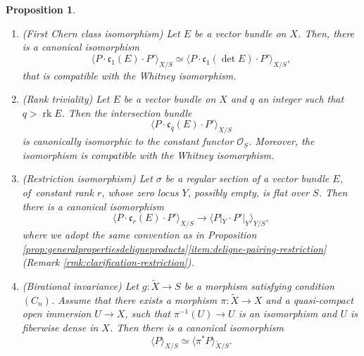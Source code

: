 \documentclass[JEP,XML,SOM,Unicode,published]{cedram}
\theoremstyle{plain}
\newtheorem{proposition}[theorem]{Proposition}
\theoremstyle{definition}
\newcommand{\Ocal}{\mathcal O}
\newcommand{\cfrak}{\mathfrak c}
\DeclareMathOperator{\rk}{rk}
\begin{document}
\begin{proposition}
\begin{enumerate}
\item\label{item:first-chern-determinant} (First Chern class isomorphism) Let $E$ be a vector bundle on $X$. Then, there is a canonical isomorphism
\begin{displaymath}
\langle P\cdot \cfrak_{1}(E)\cdot P'\rangle_{X/S} \simeq \langle P\cdot \cfrak_{1}(\det E)\cdot P'\rangle_{X/S},
\end{displaymath}
that is compatible with the Whitney isomorphism.
\item \label{item:Chern-rank}(Rank triviality) Let $E$ be a vector bundle on $X$ and $q$ an integer such that $q > \rk E$. Then the intersection bundle
\begin{displaymath}
\langle P \cdot \cfrak_q(E) \cdot P' \rangle_{X/S}
\end{displaymath}
is canonically isomorphic to the constant functor $\Ocal_S$. Moreover, the isomorphism is compatible with the Whitney isomorphism.
\item\label{item:restriction-isomorphism} (Restriction isomorphism) Let $\sigma$ be a regular section of a vector bundle $E$, of~constant rank $r$, whose zero locus $Y$, possibly empty, is flat over $S$. Then there is a canonical isomorphism
\begin{displaymath}
\langle P \cdot \cfrak_{r}(E) \cdot P' \rangle_{X/S} \to \langle P|_Y \cdot P'|_Y \rangle_{Y/S},
\end{displaymath}
where we adopt the same convention as in Proposition \ref{prop:generalpropertiesdeligneproducts}\eqref{item:deligne-pairing-restriction} (\cf Remark \ref{rmk:clarification-restriction}).
\item \label{item:birational-invariance} (Birational invariance) Let $g: \widetilde{X} \to S$ be a morphism satisfying condition $(C_n)$. Assume that there exists a morphism $\pi\colon \widetilde{X} \to X$ and a quasi-compact open immersion $U \to X$, such that $\pi^{-1}(U) \to U$ is an isomorphism and $U$ is fiberwise dense in $X$.
Then there is a canonical isomorphism
\begin{displaymath}
\langle P \rangle_{X/S}\simeq \langle \pi^\ast P \rangle_{\widetilde{X}/S}.
\end{displaymath}
\end{enumerate}
\end{proposition}
\end{document}
